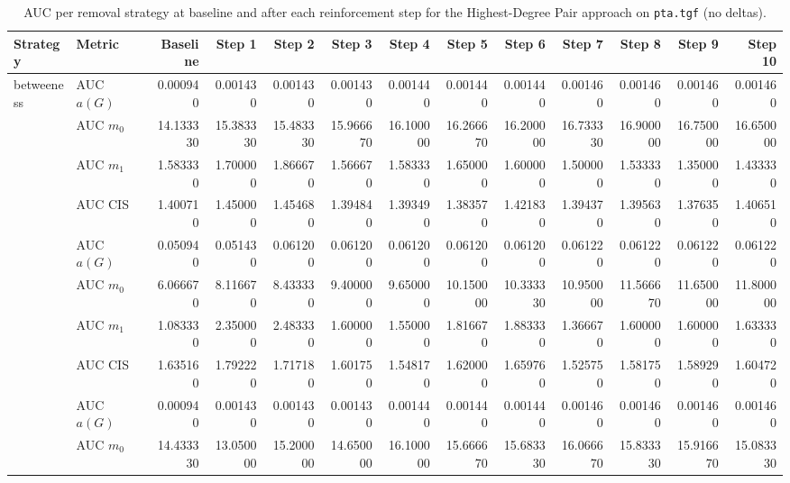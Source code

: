 \begin{table}[htbp]
  \centering
  \caption{AUC per removal strategy at baseline and after each reinforcement step for the Highest-Degree Pair approach on \texttt{pta.tgf} (no deltas).}
  \label{tab:pta-highest_degree_pair-auc}
\setlength{\tabcolsep}{2.5pt}
  \begin{tabular}{llrrrrrrrrrrr}
    \toprule
    \textbf{Strategy} & \textbf{Metric} & \textbf{Baseline} & \textbf{Step 1} & \textbf{Step 2} & \textbf{Step 3} & \textbf{Step 4} & \textbf{Step 5} & \textbf{Step 6} & \textbf{Step 7} & \textbf{Step 8} & \textbf{Step 9} & \textbf{Step 10} \\
    \midrule
    \multirow{4}{*}{betweeness} & AUC $a(G)$ & 0.000940 & 0.001430 & 0.001430 & 0.001430 & 0.001440 & 0.001440 & 0.001440 & 0.001460 & 0.001460 & 0.001460 & 0.001460 \\
    & AUC $m_0$ & 14.133330 & 15.383330 & 15.483330 & 15.966670 & 16.100000 & 16.266670 & 16.200000 & 16.733330 & 16.900000 & 16.750000 & 16.650000 \\
    & AUC $m_1$ & 1.583330 & 1.700000 & 1.866670 & 1.566670 & 1.583330 & 1.650000 & 1.600000 & 1.500000 & 1.533330 & 1.350000 & 1.433330 \\
    & AUC CIS & 1.400710 & 1.450000 & 1.454680 & 1.394840 & 1.393490 & 1.383570 & 1.421830 & 1.394370 & 1.395630 & 1.376350 & 1.406510 \\
    \addlinespace
    \multirow{4}{*}{closeness} & AUC $a(G)$ & 0.050940 & 0.051430 & 0.061200 & 0.061200 & 0.061200 & 0.061200 & 0.061200 & 0.061220 & 0.061220 & 0.061220 & 0.061220 \\
    & AUC $m_0$ & 6.066670 & 8.116670 & 8.433330 & 9.400000 & 9.650000 & 10.150000 & 10.333330 & 10.950000 & 11.566670 & 11.650000 & 11.800000 \\
    & AUC $m_1$ & 1.083330 & 2.350000 & 2.483330 & 1.600000 & 1.550000 & 1.816670 & 1.883330 & 1.366670 & 1.600000 & 1.600000 & 1.633330 \\
    & AUC CIS & 1.635160 & 1.792220 & 1.717180 & 1.601750 & 1.548170 & 1.620000 & 1.659760 & 1.525750 & 1.581750 & 1.589290 & 1.604720 \\
    \addlinespace
    \multirow{4}{*}{core influence} & AUC $a(G)$ & 0.000940 & 0.001430 & 0.001430 & 0.001430 & 0.001440 & 0.001440 & 0.001440 & 0.001460 & 0.001460 & 0.001460 & 0.001460 \\
    & AUC $m_0$ & 14.433330 & 13.050000 & 15.200000 & 14.650000 & 16.100000 & 15.666670 & 15.683330 & 16.066670 & 15.833330 & 15.916670 & 15.083330 \\

\end{tabular}
\end{table}

